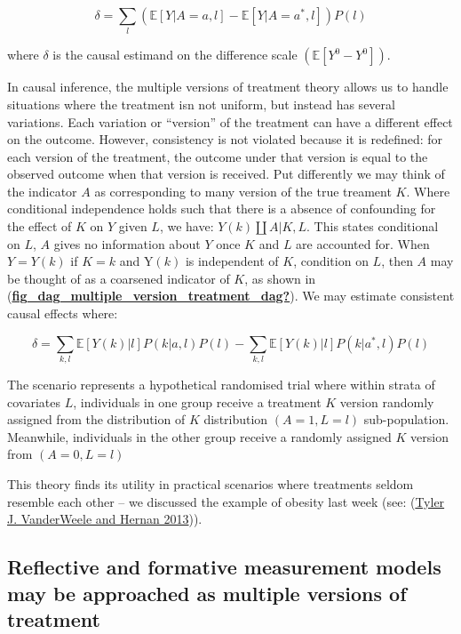 \documentclass[
  singlecolumn]{report}
\begin{document}
\[ \delta = \sum_l \left( \mathbb{E}[Y|A=a,l] - \mathbb{E}[Y|A=a^*,l] \right) P(l)\]

where \(\delta\) is the causal estimand on the difference scale
\((\mathbb{E}[Y^0 - Y^0])\).

In causal inference, the multiple versions of treatment theory allows us
to handle situations where the treatment isn not uniform, but instead
has several variations. Each variation or ``version'' of the treatment
can have a different effect on the outcome. However, consistency is not
violated because it is redefined: for each version of the treatment, the
outcome under that version is equal to the observed outcome when that
version is received. Put differently we may think of the indicator \(A\)
as corresponding to many version of the true treament \(K\). Where
conditional independence holds such that there is a absence of
confounding for the effect of \(K\) on \(Y\) given \(L\), we have:
\(Y(k)\coprod A|K,L\). This states conditional on \(L\), \(A\) gives no
information about \(Y\) once \(K\) and \(L\) are accounted for. When
\(Y = Y(k)\) if \(K = k\) and Y\((k)\) is independent of \(K\),
condition on \(L\), then \(A\) may be thought of as a coarsened
indicator of \(K\), as shown in
(\protect\hyperlink{ref-fig_dag_multiple_version_treatment_dag}{\textbf{fig\_dag\_multiple\_version\_treatment\_dag?}}).
We may estimate consistent causal effects where:

\[ \delta = \sum_{k,l} \mathbb{E}[Y(k)|l] P(k|a,l) P(l) - \sum_{k,l} \mathbb{E}[Y(k)|l] P(k|a^*,l) P(l)\]

The scenario represents a hypothetical randomised trial where within
strata of covariates \(L\), individuals in one group receive a treatment
\(K\) version randomly assigned from the distribution of \(K\)
distribution \((A = 1, L = l)\) sub-population. Meanwhile, individuals
in the other group receive a randomly assigned \(K\) version from
\((A = 0, L = l)\)

This theory finds its utility in practical scenarios where treatments
seldom resemble each other -- we discussed the example of obesity last
week (see: (\protect\hyperlink{ref-vanderweele2013}{Tyler J. VanderWeele
and Hernan 2013})).

\hypertarget{reflective-and-formative-measurement-models-may-be-approached-as-multiple-versions-of-treatment}{%
\subsection{Reflective and formative measurement models may be
approached as multiple versions of
treatment}\label{reflective-and-formative-measurement-models-may-be-approached-as-multiple-versions-of-treatment}}
\end{document}
